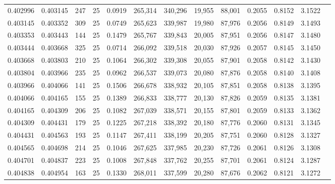\begin{tabular}{rrrrrrrrrrrrr}
0.402996 & 0.403145 &   247 &  25 &                                     0.0919 & 265,314 & 340,296 &  19,955 &  88,001 & 0.2055 & 0.8152 & 3.1522 \\
0.403145 & 0.403352 &   309 &  25 &                                     0.0749 & 265,623 & 339,987 &  19,980 &  87,976 & 0.2056 & 0.8149 & 3.1493 \\
0.403353 & 0.403443 &   144 &  25 &                                     0.1479 & 265,767 & 339,843 &  20,005 &  87,951 & 0.2056 & 0.8147 & 3.1480 \\
0.403444 & 0.403668 &   325 &  25 &                                     0.0714 & 266,092 & 339,518 &  20,030 &  87,926 & 0.2057 & 0.8145 & 3.1450 \\
0.403668 & 0.403803 &   210 &  25 &                                     0.1064 & 266,302 & 339,308 &  20,055 &  87,901 & 0.2058 & 0.8142 & 3.1430 \\
0.403804 & 0.403966 &   235 &  25 &                                     0.0962 & 266,537 & 339,073 &  20,080 &  87,876 & 0.2058 & 0.8140 & 3.1408 \\
0.403966 & 0.404066 &   141 &  25 &                                     0.1506 & 266,678 & 338,932 &  20,105 &  87,851 & 0.2058 & 0.8138 & 3.1395 \\
0.404066 & 0.404165 &   155 &  25 &                                     0.1389 & 266,833 & 338,777 &  20,130 &  87,826 & 0.2059 & 0.8135 & 3.1381 \\
0.404165 & 0.404309 &   206 &  25 &                                     0.1082 & 267,039 & 338,571 &  20,155 &  87,801 & 0.2059 & 0.8133 & 3.1362 \\
0.404309 & 0.404431 &   179 &  25 &                                     0.1225 & 267,218 & 338,392 &  20,180 &  87,776 & 0.2060 & 0.8131 & 3.1345 \\
0.404431 & 0.404563 &   193 &  25 &                                     0.1147 & 267,411 & 338,199 &  20,205 &  87,751 & 0.2060 & 0.8128 & 3.1327 \\
0.404565 & 0.404698 &   214 &  25 &                                     0.1046 & 267,625 & 337,985 &  20,230 &  87,726 & 0.2061 & 0.8126 & 3.1308 \\
0.404701 & 0.404837 &   223 &  25 &                                     0.1008 & 267,848 & 337,762 &  20,255 &  87,701 & 0.2061 & 0.8124 & 3.1287 \\
0.404838 & 0.404954 &   163 &  25 &                                     0.1330 & 268,011 & 337,599 &  20,280 &  87,676 & 0.2062 & 0.8121 & 3.1272 \\

\end{tabular}
